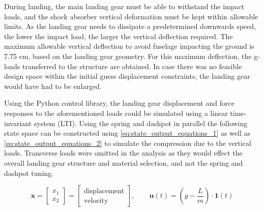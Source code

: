 During landing, the main landing gear must be able to withstand the impact loads, and the shock absorber vertical deformation must be kept within allowable limits. As the landing gear needs to dissipate a predetermined downwards speed, the lower the impact load, the larger the vertical deflection required. The maximum allowable vertical deflection to avoid fuselage impacting the ground is 7.75 cm, based on the landing gear geometry. For this maximum deflection, the g-loads transferred to the structure are obtained. In case there was no feasible design space within the initial guess displacement constraints, the landing gear would have had to be enlarged.

Using the Python control library, the landing gear displacement and force responses to the aforementioned loads could be simulated using a linear time-invariant system (LTI). Using the spring and dashpot in parallel the following state space can be constructed using \autoref{eq:state_output_equations_1} as well as \autoref{eq:state_output_equations_2} to simulate the compression due to the vertical loads. Transverse loads were omitted in the analysis as they would effect the overall landing gear structure and material selection, and not the spring and dashpot tuning.

\begin{equation}
    \mathbf{x} = \begin{bmatrix} x_1 \\ x_2 \end{bmatrix}
    = \begin{bmatrix} \text{displacement} \\ \text{velocity} \end{bmatrix}, \qquad
    \mathbf{u}(t) = \left(g - \frac{L}{m}\right) \cdot \mathbf{1}(t)
    \label{eq:state_output_equations_1}
\end{equation}


